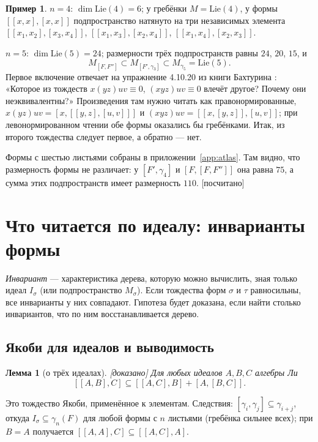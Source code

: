 \documentclass[11pt]{article}
\newcommand{\Lie}{\mathrm{Lie}}
\newcommand{\g}{\gamma}
\newcommand{\stat}[1]{\textsf{\small[#1]}}
\newcommand{\proved}{\stat{доказано}}
\newcommand{\computed}{\stat{посчитано}}
\theoremstyle{plain}
\newtheorem{lemma}[theorem]{Лемма}
\theoremstyle{definition}
\newtheorem{example}[theorem]{Пример}
\theoremstyle{remark}
\begin{document}
\begin{example}
$n=4$: $\dim\Lie(4)=6$; у гребёнки $M=\Lie(4)$, у формы $[[x,x],[x,x]]$ подпространство натянуто на три независимых элемента $[[x_1,x_2],[x_3,x_4]]$, $[[x_1,x_3],[x_2,x_4]]$, $[[x_1,x_4],[x_2,x_3]]$.

$n=5$: $\dim\Lie(5)=24$; размерности трёх подпространств равны $24$, $20$, $15$, и
\[ M_{[F,F'']}\subset M_{[F',\g_3]}\subset M_{\g_5}=\Lie(5). \]
Первое включение отвечает на упражнение 4.10.20 из книги Бахтурина \cite{Bah}: «Которое из тождеств $x(yz)uv\equiv0$, $(xyz)uv\equiv0$ влечёт другое? Почему они неэквивалентны?» Произведения там нужно читать как правонормированные, $x(yz)uv=[x,[[y,z],[u,v]]]$ и $(xyz)uv=[[x,[y,z]],[u,v]]$; при левонормированном чтении обе формы оказались бы гребёнками. Итак, из второго тождества следует первое, а обратно --- нет.
\end{example}

Формы с шестью листьями собраны в приложении~\ref{app:atlas}. Там видно, что размерность формы не различает: у $[F',\g_4]$ и $[F,[F,F'']]$ она равна $75$, а сумма этих подпространств имеет размерность $110$. \computed

\section{Что читается по идеалу: инварианты формы}\label{sec:inv}

\emph{Инвариант} --- характеристика дерева, которую можно вычислить, зная только идеал $I_\sigma$ (или подпространство $M_\sigma$). Если тождества форм $\sigma$ и $\tau$ равносильны, все инварианты у них совпадают. Гипотеза будет доказана, если найти столько инвариантов, что по ним восстанавливается дерево.

\subsection{Якоби для идеалов и выводимость}

\begin{lemma}[о трёх идеалах]\label{lem:three} \proved{}
Для любых идеалов $A,B,C$ алгебры Ли
\[ [[A,B],C]\subseteq[[A,C],B]+[A,[B,C]]. \]
\end{lemma}

Это тождество Якоби, применённое к элементам. Следствия: $[\g_i,\g_j]\subseteq\g_{i+j}$, откуда $I_\sigma\subseteq\g_n(F)$ для любой формы с $n$ листьями (гребёнка сильнее всех); при $B=A$ получается $[[A,A],C]\subseteq[[A,C],A]$.
\end{document}
